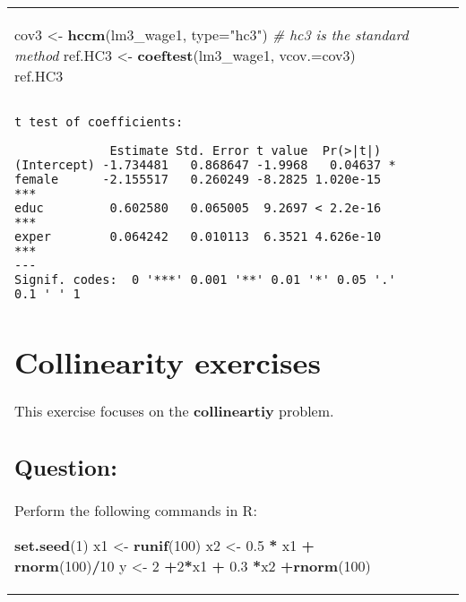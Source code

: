 \documentclass[12pt,]{article}
\newenvironment{Shaded}{\begin{snugshade}}{\end{snugshade}}
\newcommand{\CommentTok}[1]{\textcolor[rgb]{0.56,0.35,0.01}{\textit{#1}}}
\newcommand{\DataTypeTok}[1]{\textcolor[rgb]{0.13,0.29,0.53}{#1}}
\newcommand{\DecValTok}[1]{\textcolor[rgb]{0.00,0.00,0.81}{#1}}
\newcommand{\FloatTok}[1]{\textcolor[rgb]{0.00,0.00,0.81}{#1}}
\newcommand{\KeywordTok}[1]{\textcolor[rgb]{0.13,0.29,0.53}{\textbf{#1}}}
\newcommand{\NormalTok}[1]{#1}
\newcommand{\OperatorTok}[1]{\textcolor[rgb]{0.81,0.36,0.00}{\textbf{#1}}}
\newcommand{\StringTok}[1]{\textcolor[rgb]{0.31,0.60,0.02}{#1}}
\begin{document}
\begin{tabularx}{0.5\textwidth}{p{} p{} p{} p{}}
\begin{Shaded}
\begin{Highlighting}[]
\NormalTok{cov3 <-}\StringTok{ }\KeywordTok{hccm}\NormalTok{(lm3_wage1, }\DataTypeTok{type=}\StringTok{"hc3"}\NormalTok{) }\CommentTok{# hc3 is the standard method}
\NormalTok{ref.HC3 <-}\StringTok{ }\KeywordTok{coeftest}\NormalTok{(lm3_wage1, }\DataTypeTok{vcov.=}\NormalTok{cov3)}
\NormalTok{ref.HC3}
\end{Highlighting}
\end{Shaded}

\begin{verbatim}

t test of coefficients:

             Estimate Std. Error t value  Pr(>|t|)    
(Intercept) -1.734481   0.868647 -1.9968   0.04637 *  
female      -2.155517   0.260249 -8.2825 1.020e-15 ***
educ         0.602580   0.065005  9.2697 < 2.2e-16 ***
exper        0.064242   0.010113  6.3521 4.626e-10 ***
---
Signif. codes:  0 '***' 0.001 '**' 0.01 '*' 0.05 '.' 0.1 ' ' 1
\end{verbatim}

\hypertarget{collinearity-exercises}{%
\section{Collinearity exercises}\label{collinearity-exercises}}

This exercise focuses on the \textbf{collineartiy} problem.

\hypertarget{question-18}{%
\subsection{Question:}\label{question-18}}

Perform the following commands in R:

\begin{Shaded}
\begin{Highlighting}[]
\KeywordTok{set.seed}\NormalTok{(}\DecValTok{1}\NormalTok{)}
\NormalTok{x1 <-}\StringTok{ }\KeywordTok{runif}\NormalTok{(}\DecValTok{100}\NormalTok{)}
\NormalTok{x2 <-}\StringTok{ }\FloatTok{0.5} \OperatorTok{*}\StringTok{ }\NormalTok{x1 }\OperatorTok{+}\StringTok{ }\KeywordTok{rnorm}\NormalTok{(}\DecValTok{100}\NormalTok{)}\OperatorTok{/}\DecValTok{10}
\NormalTok{y <-}\StringTok{ }\DecValTok{2} \OperatorTok{+}\DecValTok{2}\OperatorTok{*}\NormalTok{x1 }\OperatorTok{+}\StringTok{ }\FloatTok{0.3} \OperatorTok{*}\NormalTok{x2 }\OperatorTok{+}\KeywordTok{rnorm}\NormalTok{(}\DecValTok{100}\NormalTok{)}
\end{Highlighting}
\end{Shaded}


\end{tabularx}
\end{document}
